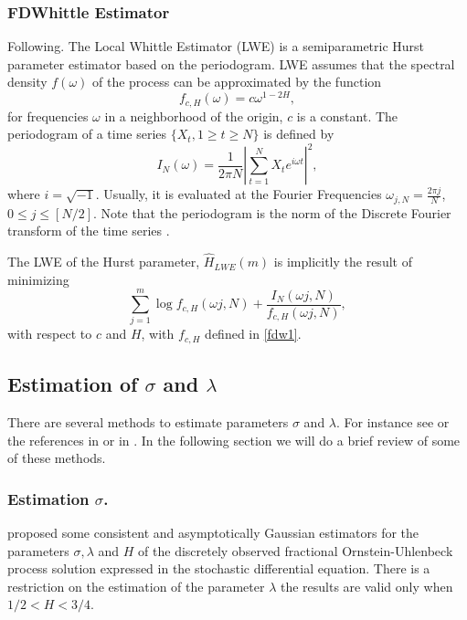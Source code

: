 \documentclass[smallextended]{svjour3}
\begin{document}
\subsubsection{FDWhittle Estimator}

    Following\cite{pa-etal}. The Local Whittle Estimator (LWE) is a 
    semiparametric Hurst parameter estimator based on the periodogram.
    LWE assumes that the spectral density $f(\omega)$ of the process can be
    approximated by the function
    \begin{equation}\label{fdw1}
        f_{c,H}(\omega) = c\omega^{1-2H},
    \end{equation}
    for frequencies $\omega$ in a neighborhood of the origin, $c$ is a constant.
    The periodogram of a time series
    $\{X_t , 1 \ge t \ge N \}$ is defined by
    $$
        I_N (\omega)  = 
            \frac{1}{2\pi N}
            \left|
                \sum_{t=1}^N X_te^{i\omega t}
            \right|^2,
    $$
    where $i=\sqrt{-1}$. Usually, it is evaluated at the Fourier Frequencies
    $\omega_{j,N} = \frac{2\pi j}{N}$, $0 \le j \le [N/2]$.  Note that the
    periodogram is the norm of the Discrete Fourier transform of the time series
    \citep[see, for example,][sect. 6.1.2]{priestley}.

    The LWE of the Hurst parameter, $\hat{H}_{LWE}(m)$  is implicitly the result
    of minimizing
    $$
        \sum_{j=1}^m  
            \log f_{c,H} 
                (\omega j, N) 
                + 
                \frac{I_N(\omega j, N)}{ f_{c,H}(\omega j,N )},
    $$
    with respect to $c$ and $H$, with $f_{c,H}$ defined in \eqref{fdw1}.

\subsection{Estimation of $\sigma$ and  $\lambda$}

    There are several methods to estimate parameters $\sigma$ and  $\lambda$. 
    For instance see \cite{ra} or the references in \cite{ne-ti} or in 
    \cite{ku-mi}. In the following section we will do a brief review of
    some of these methods.

    \subsubsection{Estimation $\sigma$.}
    \label{sect-est}

    \citet{br-ia} proposed some consistent and asymptotically
    Gaussian estimators for the parameters $\sigma,\lambda$ and $H$ of
    the discretely observed fractional Ornstein-Uhlenbeck process solution
    expressed in the stochastic differential equation.
    There is a restriction on  the estimation of the parameter $\lambda$
    \textemdash the results are valid only when $ 1 / 2 < H < 3 / 4$. 
\end{document}
